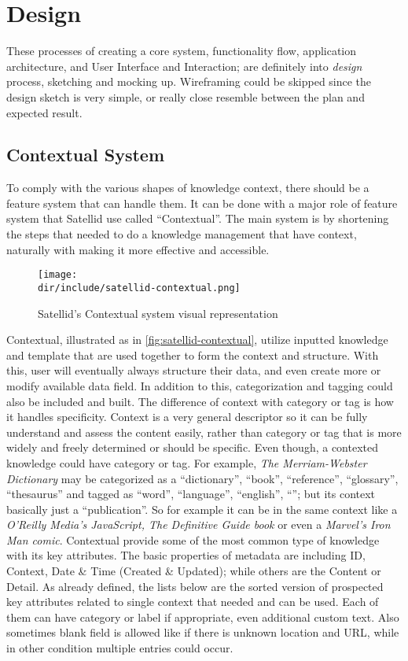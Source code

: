 \section{Design}
\label{sec:design}

These processes of creating a core system, functionality flow, application architecture, and User Interface and Interaction; are definitely into \textit{design} process, sketching and mocking up.
Wireframing could be skipped since the design sketch is very simple, or really close resemble between the plan and expected result.

\subsection{Contextual System}

To comply with the various shapes of knowledge context, there should be a feature system that can handle them.
It can be done with a major role of feature system that Satellid use called ``Contextual''.
The main system is by shortening the steps that needed to do a knowledge management that have context, naturally with making it more effective and accessible.

\begin{figure}[htb]
    \centering
    \texttt{[image: \\dir/include/satellid-contextual.png]}
    \caption{Satellid's Contextual system visual representation}
    \label{fig:satellid-contextual}
\end{figure}

Contextual, illustrated as in \autoref{fig:satellid-contextual}, utilize inputted knowledge and template that are used together to form the context and structure.
With this, user will eventually always structure their data, and even create more or modify available data field.
In addition to this, categorization and tagging could also be included and built.
The difference of context with category or tag is how it handles specificity.
Context is a very general descriptor so it can be fully understand and assess the content easily, rather than category or tag that is more widely and freely determined or should be specific.
Even though, a contexted knowledge could have category or tag.
For example, \textit{The Merriam-Webster Dictionary} may be categorized as a ``dictionary'', ``book'', ``reference'', ``glossary'', ``thesaurus'' and tagged as ``word'', ``language'', ``english'', ``''; but its context basically just a ``publication''.
So for example it can be in the same context like a \textit{O'Reilly Media's JavaScript, The Definitive Guide book} or even a \textit{Marvel's Iron Man comic}.
Contextual provide some of the most common type of knowledge with its key attributes.
The basic properties of metadata are including ID, Context, Date \& Time (Created \& Updated); while others are the Content or Detail.
As already defined, the lists below are the sorted version of prospected key attributes related to single context that needed and can be used.
Each of them can have category or label if appropriate, even additional custom text.
Also sometimes blank field is allowed like if there is unknown location and \ac{URL}, while in other condition multiple entries could occur.

